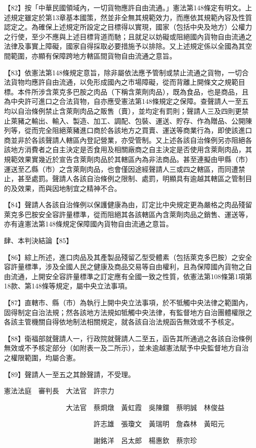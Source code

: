 \documentclass{ctexart} %
\begin{document}
{

【82】按「中華民國領域內，一切貨物應許自由流通。」憲法第148條定有明文。上述規定雖定於第13章基本國策，然並非全無其規範效力，而應依其規範內容及性質認定之。為確保上述規定所設定之目標得以實現，國家（包括中央及地方）公權力之行使，至少不應與上述目標背道而馳；且就足以妨礙或阻絕國內貨物自由流通之法律及事實上障礙，國家自得採取必要措施予以排除。又上述規定係以全國為其空間範圍，亦顯有保障跨地方轄區間貨物自由流通之意旨。


【83】依憲法第148條規定意旨，除非屬依法應予管制或禁止流通之貨物，一切合法貨物均應許自由流通，以免形成國內之市場障礙，從而背離上開條文之規範目標。本件所涉含萊克多巴胺之肉品（下稱含萊劑肉品），既為食品，也是商品，且為中央許可進口之合法貨物，自亦應受憲法第148條規定之保障。查聲請人一至五均以自治條例禁止含萊劑肉品之販售（賣），並均定有罰則；聲請人三及四則更禁止萊豬之輸出、輸入、製造、加工、調配、包裝、運送、貯存、作為贈品、公開陳列等，從而完全阻絕萊豬進口商於各該地方之買賣、運送等商業行為，即使該進口商並非於各該聲請人轄區內登記營業，亦受管制。又上述各該自治條例另亦阻絕各該地方消費者之自主決定是否食用及相關廠商之自主決定是否使用含萊劑肉品，其規範效果實幾近於宣告含萊劑肉品於其轄區內為非法商品。甚至連擬由甲縣（市）運送至乙縣（市）之含萊劑肉品，也會僅因途經聲請人三或四之轄區，而同遭禁止，甚至處罰。聲請人各該自治條例之限制、處罰，明顯具有逾越其轄區之管制目的及效果，而與因地制宜之精神不合。

【84】聲請人各該自治條例以保護健康為由，訂定比中央規定更為嚴格之肉品殘留萊克多巴胺安全容許量標準，從而阻絕其各該轄區內含萊劑肉品之銷售、運送等，亦有違憲法第148條規定保障國內貨物自由流通之意旨。

肆、本判決結論【85】

【86】綜上所述，進口肉品及其產製品殘留乙型受體素（包括萊克多巴胺）之安全容許量標準，涉及全國人民之健康及商品交易等自由權利，且為保障國內貨物之自由流通，上開安全容許量標準之訂定應有全國一致之性質，依憲法第108條第1項第18款、第148條等規定，屬中央立法事項。

【87】直轄市、縣（市）為執行上開中央立法事項，於不牴觸中央法律之範圍內，固得制定自治法規；然各該地方法規如牴觸中央法律，有監督地方自治團體權限之各該主管機關自得依地制法相關規定，就各該自治法規函告無效或不予核定。

【88】衛福部就聲請人一，行政院就聲請人二至五，函告其所通過之各該自治條例無效或不予核定部分（如附表一及二所示），並未逾越憲法賦予中央監督地方自治之權限範圍，均屬合憲。

【89】聲請人一至五之其餘聲請，不受理。

憲法法庭　審判長　大法官　許宗力

　　　　　　　　　大法官　蔡烱燉　黃虹霞　吳陳鐶　蔡明誠　林俊益

　　　　　　　　　　　　　許志雄　張瓊文　黃瑞明　詹森林　黃昭元

　　　　　　　　　　　　　謝銘洋　呂太郎　楊惠欽　蔡宗珍

}
\end{document}
